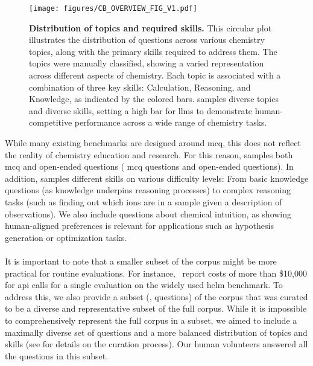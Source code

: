 \documentclass[11pt, oneside]{article}
\begin{document}
\begin{refsection}
\begin{figure}[!htb]
    \centering
    \texttt{[image: figures/CB\_OVERVIEW\_FIG\_V1.pdf]}
    \caption{\textbf{Distribution of topics and required skills.} This circular plot illustrates the distribution of questions across various chemistry topics, along with the primary skills required to address them. The topics were manually classified, showing a varied representation across different aspects of chemistry. Each topic is associated with a combination of three key skills: Calculation, Reasoning, and Knowledge, as indicated by the colored bars. \chembench samples diverse topics and diverse skills, setting a high bar for \glspl{llm} to demonstrate human-competitive performance across a wide range of chemistry tasks.}
    \label{fig:corpus}
\end{figure}


While many existing benchmarks are designed around \gls{mcq}, this does not reflect the reality of chemistry education and research.
For this reason, \chembench samples both \gls{mcq} and open-ended questions ( \gls{mcq} questions and  open-ended questions). In addition, \chembench samples different skills on various difficulty levels: From basic knowledge questions (as knowledge underpins reasoning processes\autocite{hu2024towards,bloom1956taxonomy}) to complex reasoning tasks (such as finding out which ions are in a sample given a description of observations). We also include questions about chemical intuition, as showing human-aligned preferences is relevant for applications such as hypothesis generation or optimization tasks.\autocite{zhang2024omniopenendednessmodelshuman}


\paragraph{\chembenchmini}
It is important to note that a smaller subset of the corpus might be more practical for routine evaluations.\autocite{polo2024tinybenchmarks}
For instance,~\textcite{liang2023holistic} report costs of more than \$10,000 for \gls{api} calls for a single evaluation on the widely used \gls{helm} benchmark.
To address this, we also provide a subset (\chembenchmini,  questions) of the corpus that was curated to be a diverse and representative subset of the full corpus. While it is impossible to comprehensively represent the full corpus in a subset, we aimed to include a maximally diverse set of questions and a more balanced distribution of topics and skills (see  for details on the curation process).
Our human volunteers answered all the questions in this subset.




\end{refsection}
\end{document}

